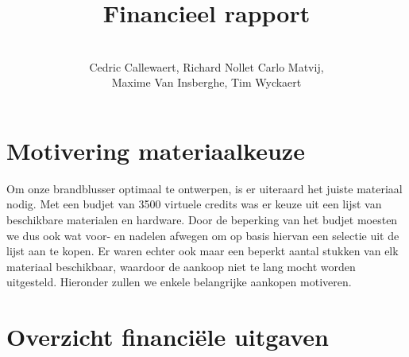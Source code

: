 \documentclass[kulak]{kulakarticle} %
\title{Financieel rapport}
\author{ \\Cedric Callewaert, Richard Nollet 
	Carlo Matvij,\\ Maxime Van Insberghe, Tim Wyckaert}
\begin{document}
\maketitle
	
	\section{Motivering materiaalkeuze}
	Om onze brandblusser optimaal te ontwerpen, is er uiteraard het juiste materiaal nodig. Met een budjet van 3500 virtuele credits was er keuze uit een lijst van beschikbare materialen en hardware. Door de beperking van het budjet moesten we dus ook wat voor- en nadelen afwegen om op basis hiervan een selectie uit de lijst aan te kopen.	Er waren echter ook maar een beperkt aantal stukken van elk materiaal beschikbaar, waardoor de aankoop niet te lang mocht worden uitgesteld.
	Hieronder zullen we enkele belangrijke aankopen motiveren.
	
	
	
	
	\section{Overzicht financiële uitgaven}
	

	
	
	
	
\end{document}
